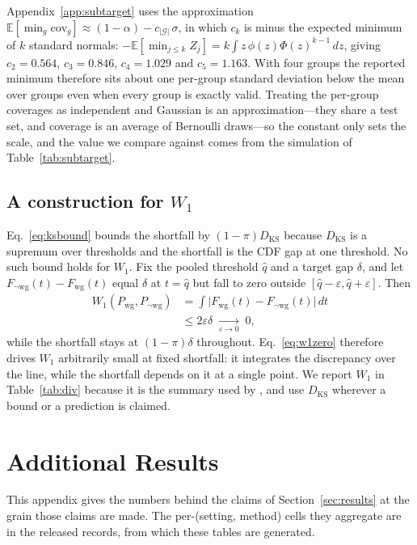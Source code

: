 \documentclass[pdflatex,sn-basic]{sn-jnl}%
\theoremstyle{thmstyleone}%
\newcommand{\wg}{\mathrm{wg}}
\newcommand{\cov}{\mathrm{cov}}
\newcommand{\Wone}{W_1}
\begin{document}
\begin{appendices}
Appendix~\ref{app:subtarget} uses the approximation
$\mathbb{E}[\min_g\cov_g]\approx(1-\alpha)-c_{|\mathcal{G}|}\,\sigma$, in which $c_k$ is minus the
expected minimum of $k$ standard normals: $-\mathbb{E}[\min_{j\le k}Z_j]=k\int
z\,\phi(z)\Phi(z)^{k-1}\,dz$, giving $c_2=0.564$, $c_3=0.846$, $c_4=1.029$ and $c_5=1.163$.
With four groups the reported minimum therefore sits about one per-group standard deviation below
the mean over groups even when every group is exactly valid. Treating the per-group coverages as independent and
Gaussian is an approximation---they share a test set, and coverage is an average of
Bernoulli draws---so the constant only sets the scale, and the value we compare against comes from
the simulation of Table~\ref{tab:subtarget}.

\subsection*{A construction for $\Wone$}

Eq.~\eqref{eq:ksbound} bounds the shortfall by $(1-\pi)D_{\mathrm{KS}}$ because
$D_{\mathrm{KS}}$ is a supremum over thresholds and the shortfall is the CDF gap at one
threshold. No such bound holds for $\Wone$. Fix the
pooled threshold $\hat q$ and a target gap $\delta$, and let
$F_{\neg\wg}(t)-F_{\wg}(t)$ equal $\delta$ at $t=\hat q$ but fall to zero outside
$[\hat q-\varepsilon,\hat q+\varepsilon]$. Then
\begin{equation}
\begin{aligned}
\Wone(P_{\wg},P_{\neg\wg})
&= \int\big|F_{\wg}(t)-F_{\neg\wg}(t)\big|\,dt \\
&\le 2\varepsilon\delta \;\xrightarrow[\varepsilon\to0]{}\; 0 ,
\end{aligned}
\label{eq:w1zero}
\end{equation}
while the shortfall stays at $(1-\pi)\delta$ throughout. Eq.~\eqref{eq:w1zero} therefore drives
$\Wone$ arbitrarily small at fixed shortfall: it integrates the discrepancy over the line, while
the shortfall depends on it at a single point. We report $\Wone$ in
Table~\ref{tab:div} because it is the summary used by \citet{burden2026}, and use
$D_{\mathrm{KS}}$ wherever a bound or a prediction is claimed.

\section{Additional Results}
\label{app:supp}

This appendix gives the numbers behind the claims of Section~\ref{sec:results} at the grain those
claims are made. The per-(setting, method) cells they aggregate are in the released records, from
which these tables are generated.


\end{appendices}
\end{document}
